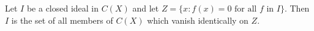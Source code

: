 Let $I$ be a closed ideal in $C(X)$ and let $Z = \{x : f(x) = 0 \text{ for all } f \text{ in } I\}$. Then $I$ is the set of all members of $C(X)$ which vanish identically on $Z$.
